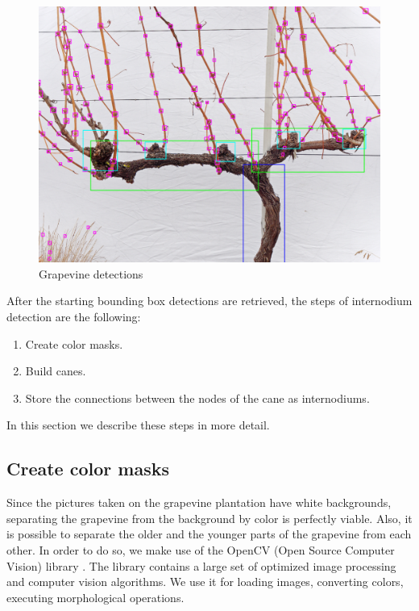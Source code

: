 \documentclass{PSAIE}%
\begin{document}
\begin{figure}[h]
      \centering
      \includegraphics[scale=0.28]{images/grapevine_yolo.png}
      \caption{Grapevine detections \cite{hellman2003grapevine}}
      \label{fig_grapevine_YOLO}
\end{figure}

After the starting bounding box detections are retrieved, the steps of internodium detection are the following:

\begin{enumerate}
      \item Create color masks.
      \item Build canes.
      \item Store the connections between the nodes of the cane as internodiums.
\end{enumerate}

In this section we describe these steps in more detail.

\subsection{Create color masks} \label{sec_create_color_masks}
Since the pictures taken on the grapevine plantation have white backgrounds, separating the grapevine
from the background by color is perfectly viable. Also, it is possible to separate the older and the
younger parts of the grapevine from each other. In order to do so, we make use of the OpenCV
(Open Source Computer Vision)
library \cite{opencv_library}. The library contains a large set of optimized image processing and computer
vision algorithms. We use it for loading images, converting colors, executing morphological operations.
\end{document}
